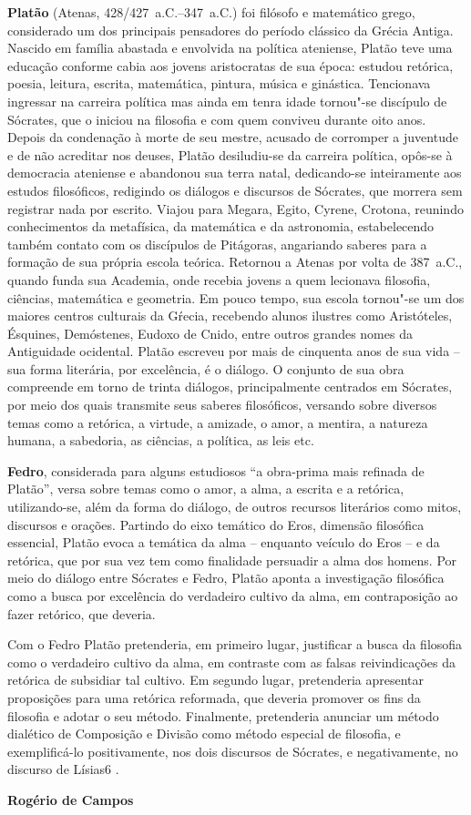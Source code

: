
\textbf{Platão} (Atenas, 428/427~a.C.--347~a.C.) foi filósofo e matemático grego, considerado um dos principais pensadores do período clássico da Grécia Antiga. Nascido em família abastada e envolvida na política ateniense, Platão teve uma educação conforme cabia aos jovens aristocratas de sua época: estudou retórica, poesia, leitura, escrita, matemática, pintura, música e ginástica. Tencionava ingressar na carreira política mas ainda em tenra idade tornou"-se discípulo de Sócrates, que o iniciou na filosofia e com quem conviveu durante oito anos. Depois da condenação à morte de seu mestre, acusado de corromper a juventude e de não acreditar nos deuses, Platão desiludiu-se da carreira política, opôs-se à democracia ateniense e abandonou sua terra natal, dedicando-se inteiramente aos estudos filosóficos, redigindo os diálogos e discursos de Sócrates, que morrera sem registrar nada por escrito. Viajou para Megara, Egito, Cyrene, Crotona, reunindo conhecimentos da metafísica, da matemática e da astronomia, estabelecendo também contato com os discípulos de Pitágoras, angariando saberes para a formação de sua própria escola teórica. Retornou a Atenas por volta de 387~a.C., quando funda sua Academia, onde recebia jovens a quem lecionava filosofia, ciências, matemática e geometria. Em pouco tempo, sua escola tornou"-se um dos maiores centros culturais da Gŕecia, recebendo alunos ilustres como Aristóteles, Ésquines, Demóstenes, Eudoxo de Cnido, entre outros grandes nomes da Antiguidade ocidental. Platão escreveu por mais de cinquenta anos de sua vida -- sua forma literária, por excelência, é o diálogo. O conjunto de sua obra compreende em torno de trinta diálogos, principalmente centrados em Sócrates, por meio dos quais transmite seus saberes filosóficos, versando sobre diversos temas como a retórica, a virtude, a amizade, o amor, a mentira, a natureza humana, a sabedoria, as ciências, a política, as leis etc. 

\textbf{Fedro}, considerada para alguns estudiosos ``a obra-prima mais refinada de Platão'', versa sobre temas como o amor, a alma, a escrita e a retórica, utilizando-se, além da forma do diálogo, de outros recursos literários como mitos, discursos e orações. Partindo do eixo temático do Eros, dimensão filosófica essencial, Platão evoca a temática da alma -- enquanto veículo do Eros -- e da retórica, que por sua vez tem como finalidade persuadir a alma dos homens. Por meio do diálogo entre Sócrates e Fedro, Platão aponta a investigação filosófica como a busca por excelência do verdadeiro cultivo da alma, em contraposição ao fazer retórico, que deveria. 


Com o Fedro Platão pretenderia, em primeiro lugar, justificar a busca da filosofia
como o verdadeiro cultivo da alma, em contraste com as falsas reivindicações
da retórica de subsidiar tal cultivo. Em segundo lugar, pretenderia
apresentar proposições para uma retórica reformada, que deveria promover
os fins da filosofia e adotar o seu método. Finalmente, pretenderia
anunciar um método dialético de Composição e Divisão como método especial
de filosofia, e exemplificá-lo positivamente, nos dois discursos de
Sócrates, e negativamente, no discurso de Lísias6
.


\textbf{Rogério de Campos} 

